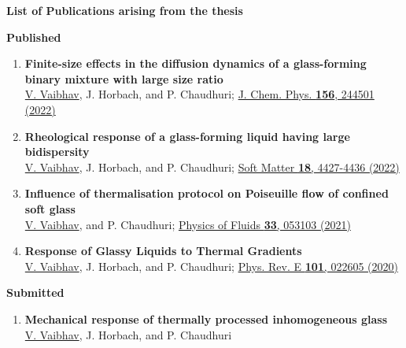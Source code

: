 \thispagestyle{plain}
\centerline{{\bf {\Large List of Publications arising from the thesis}}}

\vspace{0.5cm}
{\bf {\large Published}}
\begin{enumerate}

    \item {\bf{Finite-size effects in the diffusion dynamics of a glass-forming binary mixture with large size ratio}}\\ 
    \underline{V. Vaibhav}, J. Horbach, and P. Chaudhuri; \href{https://aip.scitation.org/doi/10.1063/5.0090330}{J. Chem. Phys. {\bf 156}, 244501 (2022)}
    
    \item {\bf{Rheological response of a glass-forming liquid having large bidispersity}}\\ 
    \underline{V. Vaibhav}, J. Horbach, and P. Chaudhuri; \href{https://doi.org/10.1039/D2SM00326K}{Soft Matter {\bf 18}, 4427-4436 (2022)}
    
    \item {\bf{Influence of thermalisation protocol on Poiseuille flow of confined soft glass}}\\ 
    \underline{V. Vaibhav}, and P. Chaudhuri; \href{https://aip.scitation.org/doi/pdf/10.1063/5.0045302}{ Physics of Fluids \textbf{33}, 053103 (2021)}

    \item {\bf{Response of Glassy Liquids to Thermal Gradients}}\\ 
    \underline{V. Vaibhav}, J. Horbach, and P. Chaudhuri; \href{https://journals.aps.org/pre/abstract/10.1103/PhysRevE.101.022605}{Phys. Rev. E \textbf{101}, 022605 (2020)}

\end{enumerate}

\vspace{0.5cm}
{\bf {\large Submitted}}
\begin{enumerate}
 
    \item {\bf{Mechanical response of thermally processed inhomogeneous glass}}\\ 
    \underline{V. Vaibhav}, J. Horbach, and P. Chaudhuri
 
\end{enumerate}

%


